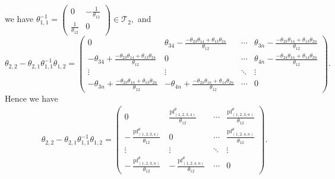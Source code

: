 \documentclass[9pt, BCOR=2mm]{amsart}
\numberwithin{equation}{section}
\numberwithin{equation}{section}
\newcommand{\pf}{{\operatorname{pf}}}
\begin{document}
we have  $ \theta_{1,1}^{-1}=\left(\begin{matrix}
                 0 &  -\frac{1}{\theta_{12}} \\
              \frac{1}{\theta_{12}}& 0
                 \end{matrix}\right)\in\mathcal{T}_2,$ and
$$\theta_{2,2}-\theta_{2,1}\theta_{1,1}^{-1}\theta_{1,2}=\left(\begin{matrix}
                 0 &              \theta_{34}-\frac{-\theta_{23}\theta_{14}+\theta_{13}\theta_{24}}{\theta_{12}}&\cdots&\theta_{3n}-\frac{-\theta_{23}\theta_{1n}+\theta_{13}\theta_{2n}}{\theta_{12}} \\
              - \theta_{34}+\frac{-\theta_{23}\theta_{14}+\theta_{13}\theta_{24}}{\theta_{12}}& 0&\cdots&\theta_{4n}-\frac{-\theta_{24}\theta_{1n}+\theta_{14}\theta_{2n}}{\theta_{12}}\\
              \vdots&\vdots&\ddots&\vdots\\
              -\theta_{3n}+\frac{-\theta_{23}\theta_{1n}+\theta_{13}\theta_{2n}}{\theta_{12}}&-\theta_{4n}+\frac{-\theta_{24}\theta_{1n}+\theta_{14}\theta_{2n}}{\theta_{12}}&\cdots&0
                 \end{matrix}\right).$$
                 Hence we have
                \begin{eqnarray}\label{F(theta)}
             \theta_{2,2}-\theta_{2,1}\theta_{1,1}^{-1}\theta_{1,2}=\left(\begin{matrix}
                0 &  \frac{{\pf}^{\theta}_{(1,2,3,4)}}{\theta_{12}}&\cdots&\frac{{\pf}^{\theta}_{(1,2,3,n)}}{\theta_{12}} \\
              - \frac{{\pf}^{\theta}_{(1,2,3,4)}}{\theta_{12}}& 0&\cdots&\frac{{\pf}^{\theta}_{(1,2,4,n)}}{\theta_{12}}\\
              \vdots&\vdots&\ddots&\vdots\\
              -\frac{{\pf}^{\theta}_{(1,2,3,n)}}{\theta_{12}}&-\frac{{\pf}^{\theta}_{(1,2,4,n)}}{\theta_{12}}&\cdots&0
                 \end{matrix}\right).
                 \end{eqnarray}
\end{document}
